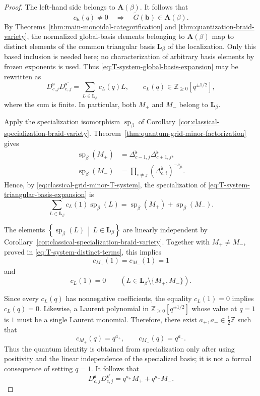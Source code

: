 \documentclass[12pt, reqno]{amsart}
\theoremstyle{plain}
\theoremstyle{definition}
\numberwithin{equation}{section}
\newcommand{\ZZ}{\mathbb{Z}}
\newcommand{\bb}{\mathbf{b}}
\begin{document}
\begin{proof}
The left-hand side belongs to \(\mathbf A(\beta)\). It follows that
\[
    c_{\bb}(q)\neq0
    \quad\Longrightarrow\quad
    \widetilde G(\bb)\in\mathbf A(\beta).
\]
By Theorems~\ref{thm:main-monoidal-categorification} and
\ref{thm:quantization-braid-variety}, the normalized global-basis
elements belonging to \(\mathbf A(\beta)\) map to distinct
elements of the common triangular basis \(\mathbf L_\beta\) of
the localization. Only this based inclusion is needed here; no
characterization of arbitrary basis elements by frozen exponents
is used. Thus
\eqref{eq:T-system-global-basis-expansion} may be rewritten as
\begin{equation}\label{eq:T-system-triangular-basis-expansion}
    D_{c,j}^{\ddot{\mathbf s}}
    D_{c,j}^{\ddot{\mathbf s}'}
    =
    \sum_{L\in\mathbf L_\beta}
        c_L(q)L,
    \qquad
    c_L(q)\in\ZZ_{\geq0}[q^{\pm1/2}],
\end{equation}
where the sum is finite. In particular, both \(M_+\) and \(M_-\)
belong to \(\mathbf L_\beta\).

Apply the specialization isomorphism
\(\operatorname{sp}_\beta\) of
Corollary~\ref{cor:classical-specialization-braid-variety}.
Theorem~\ref{thm:quantum-grid-minor-factorization} gives
\[
\begin{aligned}
    \operatorname{sp}_\beta(M_+)
    &=
    \Delta_{c-1,j}^{\ddot{\mathbf s}}
    \Delta_{c+1,j}^{\ddot{\mathbf s}},\\
    \operatorname{sp}_\beta(M_-)
    &=
    \prod_{i\neq j}
    \left(
        \Delta_{c,i}^{\ddot{\mathbf s}}
    \right)^{-c_{ji}}.
\end{aligned}
\]
Hence, by
\eqref{eq:classical-grid-minor-T-system}, the specialization of
\eqref{eq:T-system-triangular-basis-expansion} is
\[
    \sum_{L\in\mathbf L_\beta}
        c_L(1)\operatorname{sp}_\beta(L)
    =
    \operatorname{sp}_\beta(M_+)
    +
    \operatorname{sp}_\beta(M_-).
\]

The elements
\(
    \left\{
        \operatorname{sp}_\beta(L)
        \,\middle|\,
        L\in\mathbf L_\beta
    \right\}
\)
are linearly independent by
Corollary~\ref{cor:classical-specialization-braid-variety}.
Together with \(M_+\neq M_-\), proved in
\eqref{eq:T-system-distinct-terms}, this implies
\[
    c_{M_+}(1)=c_{M_-}(1)=1
\]
and
\[
    c_L(1)=0
    \qquad
    \left(
        L\in\mathbf L_\beta
        \setminus\{M_+,M_-\}
    \right).
\]

Since every \(c_L(q)\) has nonnegative coefficients, the equality
\(c_L(1)=0\) implies \(c_L(q)=0\). Likewise, a Laurent polynomial in
\(\ZZ_{\geq0}[q^{\pm1/2}]\) whose value at \(q=1\) is \(1\) must be a
single Laurent monomial. Therefore, there exist
\(a_+,a_-\in\frac12\ZZ\) such that
\[
    c_{M_+}(q)=q^{a_+},
    \qquad
    c_{M_-}(q)=q^{a_-}.
\]
Thus the quantum identity is obtained from specialization only after
using positivity and the linear independence of the specialized
basis; it is not a formal consequence of setting \(q=1\).
It follows that
\[
    D_{c,j}^{\ddot{\mathbf s}}
    D_{c,j}^{\ddot{\mathbf s}'}
    =
    q^{a_+}M_+
    +
    q^{a_-}M_-.
\]


\end{proof}
\end{document}
